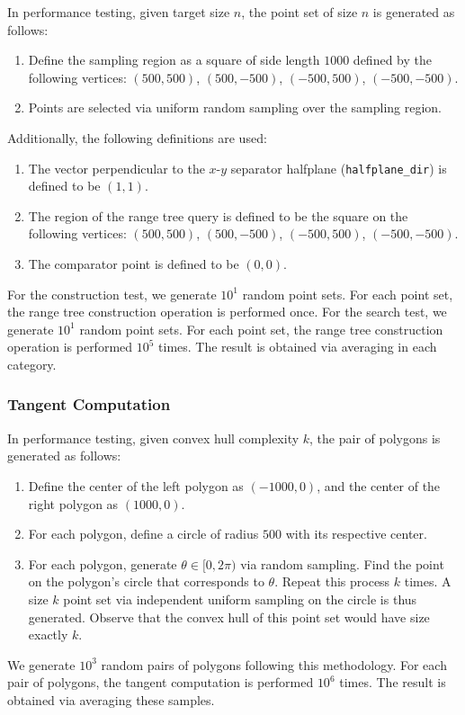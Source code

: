 \documentclass{article}
\begin{document}
\begin{appendices}
    In performance testing, given target size $n$, the point set of size $n$ is generated as follows:
    \begin{enumerate}
        \item Define the sampling region as a square of side length $1000$ defined by the following vertices: $(500, 500)$, $(500, -500)$, $(-500, 500)$, $(-500, -500)$.
        \item Points are selected via uniform random sampling over the sampling region. 
    \end{enumerate}
    Additionally, the following definitions are used:
    \begin{enumerate}
        \item The vector perpendicular to the $x$-$y$ separator halfplane (\texttt{halfplane\_dir}) is defined to be $(1, 1)$.
        \item The region of the range tree query is defined to be the square on the following vertices: $(500, 500)$, $(500, -500)$, $(-500, 500)$, $(-500, -500)$.
        \item The comparator point is defined to be $(0, 0)$.
    \end{enumerate}
    For the construction test, we generate $10^1$ random point sets. For each point set, the range tree construction operation is performed once. For the search test, we generate $10^1$ random point sets. For each point set, the range tree construction operation is performed $10^5$ times. The result is obtained via averaging in each category.

    \subsubsection{Tangent Computation}

    In performance testing, given convex hull complexity $k$, the pair of polygons is generated as follows:
    \begin{enumerate}
        \item Define the center of the left polygon as $(-1000, 0)$, and the center of the right polygon as $(1000, 0)$.
        \item For each polygon, define a circle of radius $500$ with its respective center.
        \item For each polygon, generate $\theta \in [0, 2\pi)$ via random sampling. Find the point on the polygon's circle that corresponds to $\theta$. Repeat this process $k$ times. A size $k$ point set via independent uniform sampling on the circle is thus generated. Observe that the convex hull of this point set would have size exactly $k$. 
    \end{enumerate}
    We generate $10^3$ random pairs of polygons following this methodology. For each pair of polygons, the tangent computation is performed $10^6$ times. The result is obtained via averaging these samples. 


\end{appendices}
\end{document}
